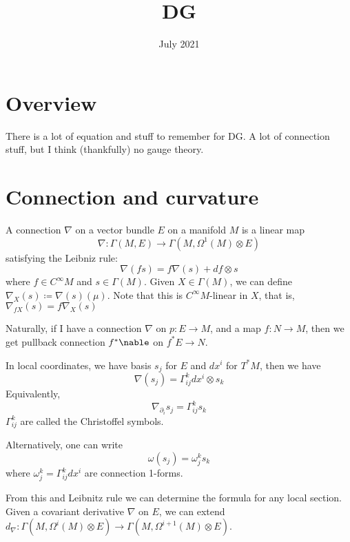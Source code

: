 \documentclass[main.tex]{subfiles}
\title{DG}
\date{July 2021}
\begin{document}
\maketitle


\section{Overview}
There is a lot of equation and stuff to remember for DG. A lot of connection stuff, but I think (thankfully) no gauge theory.

\section{Connection and curvature}


\begin{definition}
A connection $\nabla$ on a vector bundle $E$ on a manifold $M$ is a linear map 
$$
\nabla: \Gamma(M, E) \rightarrow \Gamma(M, \Omega^1(M) \otimes E )
$$
satisfying the Leibniz rule:
$$
\nabla(f s) = f \nabla(s) + df \otimes s
$$
where $f \in C^{\infty}M$ and $s \in \Gamma(M)$. Given $X \in \Gamma(M)$, we can define 
$\nabla_X(s) \coloneqq \nabla(s) (\mu)$. Note that this is $C^{\infty}M$-linear in $X$, that is, $\nabla_{fX}(s) = f \nabla_{X}(s)$
\end{definition}

Naturally, if I have a connection $\nabla$ on $p: E \rightarrow M$, and a map $f : N \rightarrow M$, then we get pullback connection $f^*\nable$ on $f^*E \rightarrow N$.

In local coordinates, we have basis $s_j$ for $E$ and $dx^i$ for $T^*M$, then we have 
$$
\nabla(s_j) = \Gamma_{ij}^k dx^i \otimes s_k
$$
Equivalently, 
$$
\nabla_{\partial_i} s_j = \Gamma_{ij}^k s_k
$$
$\Gamma_{ij}^k$ are called the Christoffel symbols.

Alternatively, one can write
$$
\omega(s_j) = \omega_j ^k s_k
$$
where $\omega_j ^k = \Gamma_{ij}^k dx^i$ are connection 1-forms.

From this and Leibnitz rule we can determine the formula for any local section.
Given a covariant derivative $\nabla$ on $E$, we can extend $d_\nabla: \Gamma(M, \Omega^i(M) \otimes E) \rightarrow \Gamma(M, \Omega^{i+1}(M) \otimes E)$. 
\end{document}

